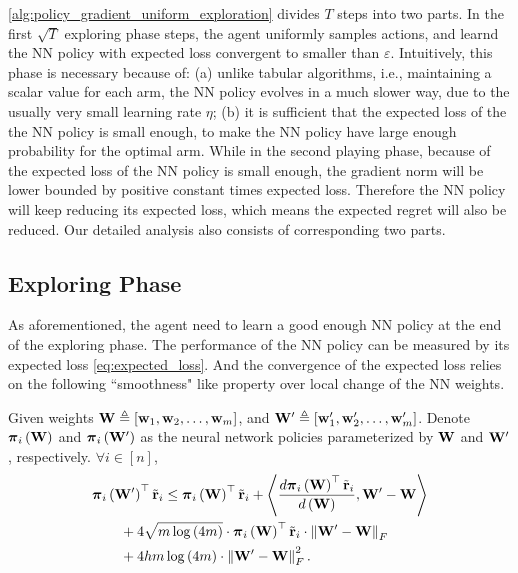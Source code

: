 \cref{alg:policy_gradient_uniform_exploration} divides $T$ steps into two parts. In the first $\sqrt{T}$ exploring phase steps, the agent uniformly samples actions, and learnd the NN policy with expected loss convergent to smaller than $\varepsilon$. Intuitively, this phase is necessary because of: (a) unlike tabular algorithms, i.e., maintaining a scalar value for each arm, the NN policy evolves in a much slower way, due to the usually very small learning rate $\eta$; (b) it is sufficient that the expected loss of the the NN policy is small enough, to make the NN policy have large enough probability for the optimal arm. While in the second playing phase, because of the expected loss of the NN policy is small enough, the gradient norm will be lower bounded by positive constant times expected loss. Therefore the NN policy will keep reducing its expected loss, which means the expected regret will also be reduced. Our detailed analysis also consists of corresponding two parts.

\subsection{Exploring Phase}
\label{subsec:exploring_phase}

As aforementioned, the agent need to learn a good enough NN policy at the end of the exploring phase. The performance of the NN policy can be measured by its expected loss \cref{eq:expected_loss}. And the convergence of the expected loss relies on the following ``smoothness" like property over local change of the NN weights.

\begin{lem}
\label{lem:smoothness}
    Given weights ${\mathbf{W}} \triangleq \left[ {\mathbf{w}}_1, {\mathbf{w}}_2, \dots, {\mathbf{w}}_m \right]$, and ${\mathbf{W}}^\prime \triangleq \left[ {\mathbf{w}}_1^\prime, {\mathbf{w}}_2^\prime, \dots, {\mathbf{w}}_m^\prime \right]$. Denote ${\boldsymbol{\pi}}_i\left( {\mathbf{W}} \right)$ and ${\boldsymbol{\pi}}_i\left( {\mathbf{W}}^\prime \right)$ as the neural network policies parameterized by ${\mathbf{W}}$ and ${\mathbf{W}}^\prime$, respectively. $\forall i \in [n]$,
\begin{equation*}
\begin{split}
    &{\boldsymbol{\pi}}_i\left( {\mathbf{W}}^\prime \right)^\top {\tilde{\mathbf{r}}}_i \le {\boldsymbol{\pi}}_i\left( {\mathbf{W}} \right)^\top {\tilde{\mathbf{r}}}_i + \left\langle \frac{d {\boldsymbol{\pi}}_i\left( {\mathbf{W}} \right)^\top {\tilde{\mathbf{r}}}_i }{d\left( {\mathbf{W}} \right)}, {\mathbf{W}}^\prime - {\mathbf{W}} \right\rangle \\
    &\qquad + 4 \sqrt{m \log{\left(4m\right)}} \cdot {\boldsymbol{\pi}}_i\left( {\mathbf{W}} \right)^\top {\tilde{\mathbf{r}}}_i \cdot \left\| {\mathbf{W}}^\prime - {\mathbf{W}} \right\|_F \\
    &\qquad + 4 h m \log{\left(4m\right)} \cdot \left\| {\mathbf{W}}^\prime - {\mathbf{W}} \right\|_F^2.
\end{split}
\end{equation*}
\end{lem}

